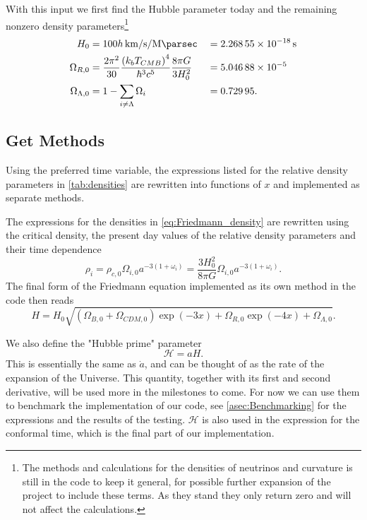 \documentclass[10pt,a4paper]{article}
\begin{document}
With this input we first find the Hubble parameter today and the remaining nonzero density parameters\footnote{The methods and calculations for the densities of neutrinos and curvature is still in the code to keep it general, for possible further expansion of the project to include these terms. As they stand they only return zero and will not affect the calculations.}
%
\begin{alignat}{2}
    H_0 &= 100h\,\si{\km\per\s\per\mega\parsec} &&= \SI{2.26855e-18}{s}\label{eq:H0}
    \\
    \Omega_{R,0} &= \frac{2\pi^2}{30}\frac{\left(k_bT_{CMB}\right)^4}{\hbar^3c^5}\frac{8\pi G}{3H_0^2} &&= \num{5.04688e-5} \label{eq:OmegaR0}
    \\
    \Omega_{\Lambda,0} &= 1 - \sum_{i\neq \Lambda} \Omega_i &&= \num{0.72995} \label{eq:OmegaLambda0}.
\end{alignat}
%
\subsection{Get Methods}
\label{subsec:Method/Get methods}
Using the preferred time variable, the expressions listed for the relative density parameters in \cref{tab:densities} are rewritten into functions of $x$ and implemented as separate methods.

The expressions for the densities in \cref{eq:Friedmann_density} are rewritten using the critical density, the present day values of the relative density parameters and their time dependence 
%
\begin{equation}
    \rho_i = \rho_{c,0} \Omega_{i,0} a^{-3(1+\omega_i)} = \frac{3H_0^2}{8\pi G}\Omega_{i,0} a^{-3(1+\omega_i)}.
\end{equation}
%
The final form of the Friedmann equation implemented as its own method in the code then reads
%
\begin{equation}
    H = H_0 \sqrt{\left(\Omega_{B,0}+\Omega_{CDM,0}\right)\exp(-3x) + \Omega_{R,0}\exp(-4x) + \Omega_{\Lambda,0}}.
    \label{eq:Friedmann implemented} 
\end{equation}

We also define the "Hubble prime" parameter
%
\begin{equation}
    \mathcal{H} = aH.
    \label{eq:Hprime}
\end{equation}
This is essentially the same as $\dot{a}$, and can be thought of as the rate of the expansion of the Universe. This quantity, together with its first and second derivative, will be used more in the milestones to come. For now we can use them to benchmark the implementation of our code, see \cref{asec:Benchmarking} for the expressions and the results of the testing. $\mathcal{H}$ is also used in the expression for the conformal time, which is the final part of our implementation.
\end{document}
